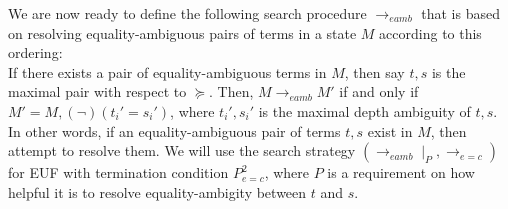 \documentclass{llncs}
\newtheorem{thm}{Theorem}
\begin{document}
We are now ready to define the following search procedure $\rightarrow_{eamb}$ that is based on resolving equality-ambiguous pairs of terms in a state $M$ according to this ordering: \\

If there exists a pair of equality-ambiguous terms in $M$, then say $t, s$ is the maximal pair with respect to $\succeq$.
Then, $M \rightarrow_{eamb} M'$ if and only if $M' = M, (\neg)(t_i' = s_i')$, where $t_i', s_i'$ is the maximal depth ambiguity of $t, s$. \\

In other words, if an equality-ambiguous pair of terms $t,s$ exist in $M$, then attempt to resolve them. 
We will use the search strategy $( \rightarrow_{eamb} \mid_P, \rightarrow_{e=c} )$ for EUF with termination condition $P^2_{e=c}$, where $P$ is a requirement on how helpful it is to resolve equality-ambigity between $t$ and $s$. \\

\begin{comment}
\begin{thm}
Given a candidate-satisifiable DPLL(T) state $M \parallel F$, if $M \rightarrow_{eamb} M'$ and $M'$ is non-terminal for quantifier instantiation with respect to $P_{eind}$, then there exists a pair of equality-ambiguous terms $t, s$ that are maximum with respect to $\succeq$.  
Futhermore, either $t$ is not an instantiation-constant, or $t$ and $s$ are instantiation constants such that $M \models t = s$.
\end{thm}
\begin{proof}
Say $M'$ is non-terminal for quantifier instantiation with respect to $P_{eind}$.
Therefore, all quantified formula $\psi_i \in M'$ are not instantiation-ready and there exists $e_i \in M$ for each $\psi_i$ that $M \not\models (e_i = s_i)$ for any concrete ground term $s_i$. 

Assume by contradiction that $t$ is an instantiation constant and $s$ is not an instantiation constant such that $M \models t = s$.
By our ordering, there does not exist a non-instantiation constant term $t'$ that is equality-ambiguous with any other term $s'$.
Since $P_{EUF}$ does not hold, there exists at least one term $t''$ such that 

In particular, this means that our unsolved constants $e_i$ do not exist as proper subterms of any term $t'$.
Therefore, since each $e_i$ is in $M$, it must be the case that either $M \models e_i \neq t''$ for some term $t''$ or $M \models e_i = t_e$ for some non-concrete term $t_e$.
\end{proof}
\end{comment}
\end{document}

